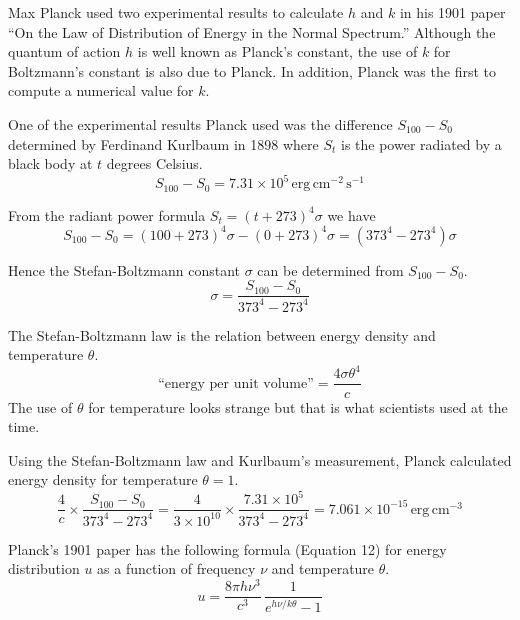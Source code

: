 \documentclass[12pt]{article}
\begin{document}
Max Planck used two experimental results to calculate $h$ and $k$ in his 1901 paper
``On the Law of Distribution of Energy in the Normal Spectrum.''
Although the quantum of action $h$ is well known as Planck's constant,
the use of $k$ for Boltzmann's constant is also due to Planck.
In addition, Planck was the first to compute a numerical value for $k$.

\bigskip
One of the experimental results Planck used was the difference $S_{100}-S_0$
determined by Ferdinand Kurlbaum in 1898 where
$S_t$ is the power radiated by a black body at $t$ degrees Celsius.
\begin{equation*}
S_{100}-S_0=7.31\times10^5\,\text{erg}\,\text{cm}^{-2}\,\text{s}^{-1}
\end{equation*}

From the radiant power formula $S_t=(t+273)^4\sigma$ we have
\begin{equation*}
S_{100}-S_0=(100+273)^4\sigma-(0+273)^4\sigma=(373^4-273^4)\sigma
\end{equation*}

Hence the Stefan-Boltzmann constant $\sigma$ can be determined from $S_{100}-S_0$.
\begin{equation*}
\sigma=\frac{S_{100}-S_0}{373^4-273^4}%
\end{equation*}

The Stefan-Boltzmann law is the relation between energy density and temperature $\theta$.
\begin{equation*}
\text{``energy per unit volume''}=\frac{4\sigma \theta^4}{c}
\end{equation*}
The use of $\theta$ for temperature looks strange but that is what scientists used at the time.

\bigskip
Using the Stefan-Boltzmann law and Kurlbaum's measurement,
Planck calculated energy density for temperature $\theta=1$.
\begin{equation*}
\frac{4}{c}\times
\frac{S_{100}-S_0}{373^4-273^4}
=\frac{4}{3\times10^{10}}\times\frac{7.31\times10^5}{373^4-273^4}
=7.061\times10^{-15}\,\text{erg}\,\text{cm}^{-3}
\end{equation*}

Planck's 1901 paper has the following formula (Equation 12) for energy distribution
$u$ as a function of frequency $\nu$ and temperature $\theta$.
\begin{equation*}
u=\frac{8\pi h\nu^3}{c^3}\,\frac{1}{e^{h\nu/k\theta}-1}
\end{equation*}
\end{document}

